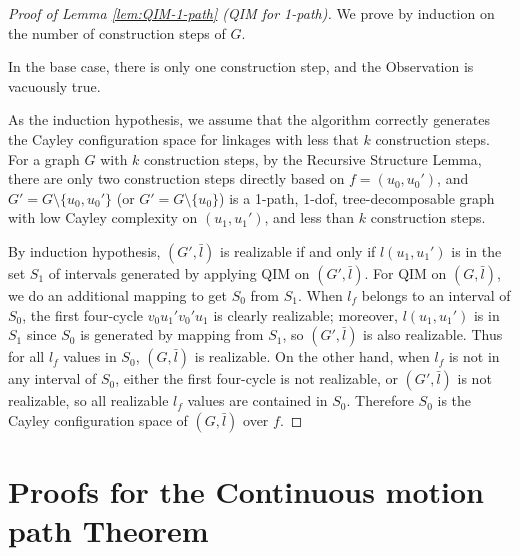 \documentclass[secthm,amsthm,english]{article}
\theoremstyle{definition}
\theoremstyle{remark}
\begin{document}
\begin{proof}[Proof of Lemma \ref{lem:QIM-1-path} (QIM for 1-path)]
We prove by induction on the number of construction steps of $G$. 

In the base case, there is only one construction step, and the Observation is vacuously true. 

As the induction hypothesis, we assume that the algorithm correctly generates the Cayley configuration space for linkages with less that $k$ construction steps. 
For a graph $G$ with $k$ construction steps, by the Recursive Structure Lemma, 
there are only two construction steps directly based on $f=(u_0,u_0')$, 
and $G' = G \setminus \{u_0,u_0'\}$ (or $G' = G \setminus \{u_0\}$) is a 1-path, 
1-dof, tree-decomposable graph with low Cayley complexity on $(u_1,u_1')$, 
and less than $k$ construction steps.

By induction hypothesis, 
$(G', \bar{l})$ is realizable if and only if $l(u_1,u_1')$ is in the set $S_1$ of intervals generated by applying QIM on $(G',\bar{l})$. 
For QIM on $(G, \bar{l})$, we do an additional mapping to get $S_0$ from $S_1$. 
When $l_f$ belongs to  an interval of $S_0$, the first four-cycle $v_0u_1'v_0'u_1$ is clearly realizable; 
moreover, $l(u_1,u_1')$ is in $S_1$ since $S_0$ is generated by mapping from $S_1$, so $(G',\bar{l})$ is also realizable. 
Thus for all $l_f$ values in $S_0$, $(G,\bar{l})$ is realizable. 
On the other hand, when $l_f$ is not in any interval of $S_0$, either the first four-cycle is not realizable, or $(G',\bar{l})$ is not realizable, 
so all realizable $l_f$ values are contained in $S_0$. 
Therefore $S_0$ is the Cayley configuration space of $(G,\bar{l})$ over $f$.
\end{proof}

\section{Proofs for the Continuous motion path Theorem} \label{app:path}
\end{document}
